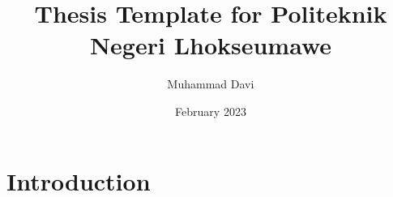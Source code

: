 \documentclass{article}
\title{Thesis Template for Politeknik Negeri Lhokseumawe}
\author{Muhammad Davi}
\date{February 2023}
\begin{document}
\maketitle

\section{Introduction}
\end{document}
